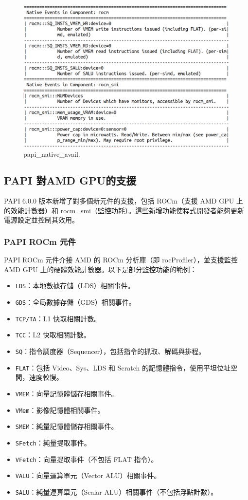 \begin{figure}
    \centering
    \includegraphics[width=0.9\linewidth]{FileAusiliari/Screenshots/Figure13-4.png}
    \caption{papi\_native\_avail.}
    \label{fig:PAPI4}
\end{figure}


\subsection{PAPI 對AMD GPU的支援}

PAPI 6.0.0 版本新增了對多個新元件的支援，包括 ROCm（支援 AMD GPU 上的效能計數器）和 rocm\_smi（監控功耗）。這些新增功能使程式開發者能夠更新電源設定並控制其效用。


\subsubsection{PAPI ROCm 元件}

PAPI ROCm 元件介接 AMD 的 ROCm 分析庫（即 rocProfiler），並支援監控 AMD GPU 上的硬體效能計數器。以下是部分監控功能的範例：

\begin{itemize}
    \item \texttt{LDS}：本地數據存儲（LDS）相關事件。
    \item \texttt{GDS}：全局數據存儲（GDS）相關事件。
    \item \texttt{TCP/TA}：L1 快取相關計數。
    \item \texttt{TCC}：L2 快取相關計數。
    \item \texttt{SQ}：指令調度器（Sequencer），包括指令的抓取、解碼與排程。
    \item \texttt{FLAT}：包括 Video、Sys、LDS 和 Scratch 的記憶體指令，使用平坦位址空間，速度較慢。
    \item \texttt{VMEM}：向量記憶體儲存相關事件。
    \item \texttt{VMem}：影像記憶體相關事件。
    \item \texttt{SMEM}：純量記憶體儲存相關事件。
    \item \texttt{SFetch}：純量提取事件。    
    \item \texttt{VFetch}：向量提取事件（不包括 FLAT 指令）。
    \item \texttt{VALU}：向量運算單元（Vector ALU）相關事件。
    \item \texttt{SALU}：純量運算單元（Scalar ALU）相關事件（不包括浮點計數）。
\end{itemize}

